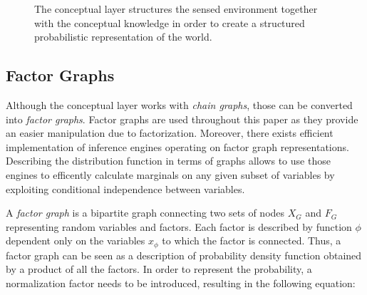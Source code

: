 \documentclass[runningheads,a4paper]{llncs}
\begin{document}
\begin{figure}[h]
\centering
{}

\caption{The conceptual layer structures the sensed environment together with the conceptual knowledge
         in order to create a structured probabilistic representation of the world.}
\end{figure}

\subsection{Factor Graphs}
Although the conceptual layer works with \emph{chain graphs}, those can be converted
into \emph{factor graphs}\cite{kschischang2001factor}. Factor graphs are used throughout this paper as they provide an
easier manipulation due to factorization.
Moreover, there exists efficient implementation of inference engines operating on factor graph
representations\cite{Mooij_libDAI_10}.
Describing the distribution function in terms of graphs allows to use those engines to
efficently calculate marginals on any given subset of variables by exploiting conditional
independence between variables.

A \emph{factor graph} is a bipartite graph connecting two sets of nodes $X_G$ and $F_G$
representing random variables and factors.
Each factor is described by function $\phi$ dependent only on the variables $x_\phi$
to which the factor is connected.
Thus, a factor graph can be seen as a description of probability density function obtained
by a product of all the factors. In order to represent the probability,
a normalization factor needs to be introduced, resulting in the following equation:
\end{document}
